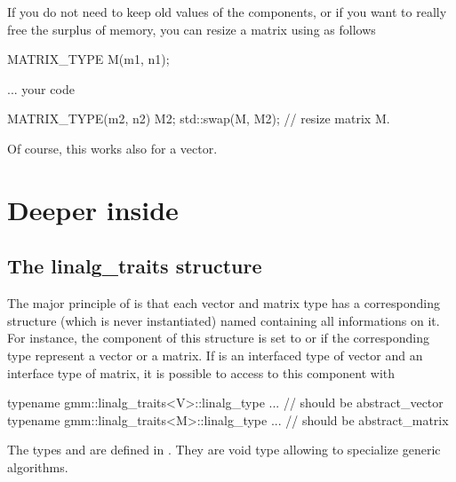 \documentclass[11pt,a4paper]{article}
\begin{document}
If you do not need to keep old values of the components, or if you want to really free the surplus of memory, you can resize a matrix using  as follows
\begin{cppcode}
  MATRIX_TYPE M(m1, n1);

  ... your code

  { MATRIX_TYPE(m2, n2) M2; std::swap(M, M2); } // resize matrix M.
\end{cppcode}
Of course, this works also for a vector.


\section{Deeper inside \gmm}

\subsection{The linalg_traits structure}
The major principle of \gmm is that each vector and matrix type has a corresponding structure (which is never instantiated) named  containing all informations on it. For instance, the component  of this structure is set to  or  if the corresponding type represent a vector or a matrix. If  is an interfaced type of vector and  an interface type of matrix, it is possible to access to this component with
\begin{cppcode}
  typename gmm::linalg_traits<V>::linalg_type ...  // should be abstract_vector
  typename gmm::linalg_traits<M>::linalg_type ...  // should be abstract_matrix
\end{cppcode}
The types  and  are defined in . They are void type allowing to specialize generic algorithms.\\
\end{document}
